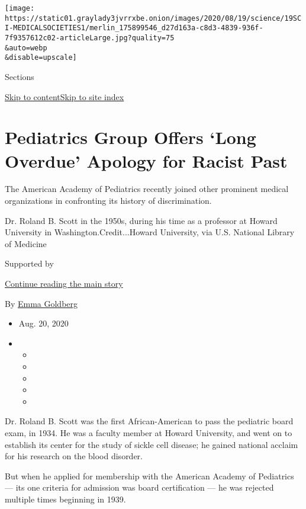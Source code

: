 \texttt{[image: https://static01.graylady3jvrrxbe.onion/images/2020/08/19/science/19SCI-MEDICALSOCIETIES1/merlin\_175899546\_d27d163a-c8d3-4839-936f-7f9357612c02-articleLarge.jpg?quality=75\\\&auto=webp\\\&disable=upscale]}

Sections

\protect\hyperlink{site-content}{Skip to
content}\protect\hyperlink{site-index}{Skip to site index}

\hypertarget{pediatrics-group-offers-long-overdue-apology-for-racist-past}{%
\section{Pediatrics Group Offers `Long Overdue' Apology for Racist
Past}\label{pediatrics-group-offers-long-overdue-apology-for-racist-past}}

The American Academy of Pediatrics recently joined other prominent
medical organizations in confronting its history of discrimination.

Dr. Roland B. Scott in the 1950s, during his time as a professor at
Howard University in Washington.Credit...Howard University, via U.S.
National Library of Medicine

Supported by

\protect\hyperlink{after-sponsor}{Continue reading the main story}

By \href{https://www.nytimes3xbfgragh.onion/by/emma-goldberg}{Emma
Goldberg}

\begin{itemize}
\item
  Aug. 20, 2020
\item
  \begin{itemize}
  \item
  \item
  \item
  \item
  \item
  \end{itemize}
\end{itemize}

Dr. Roland B. Scott was the first African-American to pass the pediatric
board exam, in 1934. He was a faculty member at Howard University, and
went on to establish its center for the study of sickle cell disease; he
gained national acclaim for his research on the blood disorder.

But when he applied for membership with the American Academy of
Pediatrics --- its one criteria for admission was board certification
--- he was rejected multiple times beginning in 1939.

